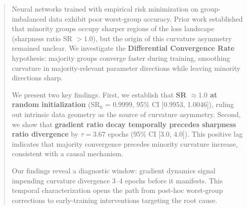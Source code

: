 \begin{abstract}
Neural networks trained with empirical risk minimization on group-imbalanced data exhibit poor worst-group accuracy. Prior work established that minority groups occupy sharper regions of the loss landscape (sharpness ratio SR $> 1.0$), but the origin of this curvature asymmetry remained unclear. We investigate the \textbf{Differential Convergence Rate} hypothesis: majority groups converge faster during training, smoothing curvature in majority-relevant parameter directions while leaving minority directions sharp.

We present two key findings. First, we establish that \textbf{SR $\approx 1.0$ at random initialization} (SR$_0$ = 0.9999, 95\% CI [0.9953, 1.0046]), ruling out intrinsic data geometry as the source of curvature asymmetry. Second, we show that \textbf{gradient ratio decay temporally precedes sharpness ratio divergence} by $\tau = 3.67$ epochs (95\% CI [3.0, 4.0]). This positive lag indicates that majority convergence precedes minority curvature increase, consistent with a causal mechanism.

Our findings reveal a diagnostic window: gradient dynamics signal impending curvature divergence 3--4 epochs before it manifests. This temporal characterization opens the path from post-hoc worst-group corrections to early-training interventions targeting the root cause.
\end{abstract}

